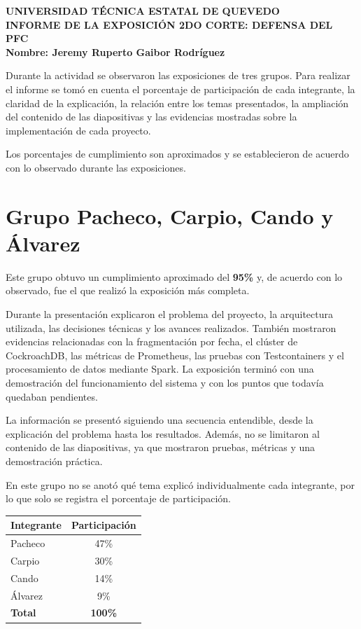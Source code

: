 \documentclass[12pt]{article}
\begin{document}
\begin{center}
    \textbf{UNIVERSIDAD TÉCNICA ESTATAL DE QUEVEDO}\\[4pt]
    \textbf{INFORME DE LA EXPOSICIÓN 2DO CORTE: DEFENSA DEL PFC}\\[4pt]
    \textbf{Nombre: Jeremy Ruperto Gaibor Rodríguez}
\end{center}

\vspace{6pt}

Durante la actividad se observaron las exposiciones de tres grupos. Para realizar el informe se tomó en cuenta el porcentaje de participación de cada integrante, la claridad de la explicación, la relación entre los temas presentados, la ampliación del contenido de las diapositivas y las evidencias mostradas sobre la implementación de cada proyecto.

Los porcentajes de cumplimiento son aproximados y se establecieron de acuerdo con lo observado durante las exposiciones.

\section*{Grupo Pacheco, Carpio, Cando y Álvarez}

Este grupo obtuvo un cumplimiento aproximado del \textbf{95\%} y, de acuerdo con lo observado, fue el que realizó la exposición más completa.

Durante la presentación explicaron el problema del proyecto, la arquitectura utilizada, las decisiones técnicas y los avances realizados. También mostraron evidencias relacionadas con la fragmentación por fecha, el clúster de CockroachDB, las métricas de Prometheus, las pruebas con Testcontainers y el procesamiento de datos mediante Spark. La exposición terminó con una demostración del funcionamiento del sistema y con los puntos que todavía quedaban pendientes.

La información se presentó siguiendo una secuencia entendible, desde la explicación del problema hasta los resultados. Además, no se limitaron al contenido de las diapositivas, ya que mostraron pruebas, métricas y una demostración práctica.

En este grupo no se anotó qué tema explicó individualmente cada integrante, por lo que solo se registra el porcentaje de participación.

\begin{center}
\begin{tabular}{lc}
\toprule
\textbf{Integrante} & \textbf{Participación} \\
\midrule
Pacheco & 47\% \\
Carpio & 30\% \\
Cando & 14\% \\
Álvarez & 9\% \\
\midrule
\textbf{Total} & \textbf{100\%} \\
\bottomrule
\end{tabular}
\end{center}
\end{document}
